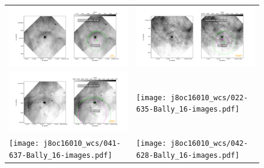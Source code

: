 \documentclass{article}
\begin{document}
\begin{figure}[htp]
\centering
\begin{tabular}{l l}
     \includegraphics[width=0.5\linewidth]{j8oc14010_wcs/136-3057-Bally_14-images.pdf}
    &\includegraphics[width=0.5\linewidth]{j8oc14010_wcs/138-3024-Bally_14-images.pdf}\\
    \includegraphics[width=0.5\linewidth]{j8oc14010_wcs/203-3039-Bally_14-images.pdf}
    &\texttt{[image: j8oc16010\_wcs/022-635-Bally\_16-images.pdf]}\\
    \texttt{[image: j8oc16010\_wcs/041-637-Bally\_16-images.pdf]} 
    &\texttt{[image: j8oc16010\_wcs/042-628-Bally\_16-images.pdf]}\\
   
\end{tabular}
\end{figure}
\end{document}
